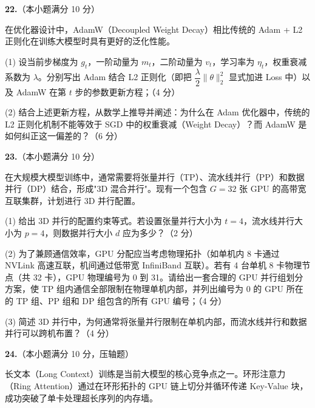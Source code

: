 \documentclass[a4paper]{ctexart}
\begin{document}
\vspace{10em}

\newpage

\noindent\textbf{22.}（本小题满分 10 分）

在优化器设计中，AdamW（Decoupled Weight Decay）相比传统的 Adam + L2 正则化在训练大模型时具有更好的泛化性能。

\vspace{0.3em}
(1) 设当前步梯度为 $g_t$，一阶动量为 $m_t$，二阶动量为 $v_t$，学习率为 $\eta_t$，权重衰减系数为 $\lambda$。分别写出 Adam 结合 L2 正则化（即把 $\dfrac{\lambda}{2}\|\theta\|_2^2$ 显式加进 Loss 中）以及 AdamW 在第 $t$ 步的参数更新方程；（4 分）

\vspace{0.3em}
(2) 结合上述更新方程，从数学上推导并阐述：为什么在 Adam 优化器中，传统的 L2 正则化机制不能等效于 SGD 中的权重衰减（Weight Decay）？而 AdamW 是如何纠正这一偏差的？（6 分）

\vspace{10em}

\noindent\textbf{23.}（本小题满分 10 分）

在大规模大模型训练中，通常需要将张量并行（TP）、流水线并行（PP）和数据并行（DP）结合，形成"3D 混合并行"。现有一个包含 $G = 32$ 张 GPU 的高带宽互联集群，计划进行 3D 并行配置。

\vspace{0.3em}
(1) 给出 3D 并行的配置约束等式。若设置张量并行大小为 $t = 4$，流水线并行大小为 $p = 4$，则数据并行大小 $d$ 应为多少？（2 分）

\vspace{0.3em}
(2) 为了兼顾通信效率，GPU 分配应当考虑物理拓扑（如单机内 8 卡通过 NVLink 高速互联，机间通过低带宽 InfiniBand 互联）。若有 4 台单机 8 卡物理节点（共 32 卡），GPU 物理编号为 0 到 31。请给出一套合理的 GPU 并行组划分方案，使 TP 组内通信全部限制在物理单机内部，并列出编号为 0 的 GPU 所在的 TP 组、PP 组和 DP 组包含的所有 GPU 编号；（4 分）

\vspace{0.3em}
(3) 简述 3D 并行中，为何通常将张量并行限制在单机内部，而流水线并行和数据并行可以跨机布置？（4 分）

\vspace{10em}

\noindent\textbf{24.}（本小题满分 10 分，压轴题）

长文本（Long Context）训练是当前大模型的核心竞争点之一。环形注意力（Ring Attention）通过在环形拓扑的 GPU 链上切分并循环传递 Key-Value 块，成功突破了单卡处理超长序列的内存墙。
\end{document}
